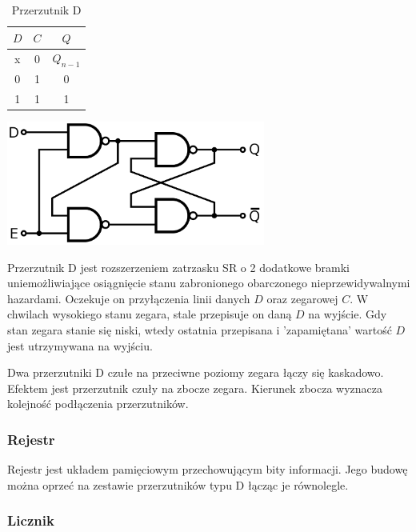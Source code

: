 \documentclass[a4paper,12pt]{article}
\begin{document}
\begin{table}[h!]
\centering

\begin{minipage}{6.5cm}
\centering

\begin{tabular}{ | c | c || c | }
  \hline
  $D$ & $C$ & $Q$ \\ \hline
  x & 0 & $Q_{n-1}$ \\
  0 & 1 & 0 \\
  1 & 1 & 1 \\
  \hline
\end{tabular}
\end{minipage}
\begin{minipage}{10cm}
   \includegraphics[width=8.5cm]{grafika/obwody/gated-D-latch.png}
   \caption*{Przerzutnik D}
\end{minipage}
\end{table}

Przerzutnik D jest rozszerzeniem zatrzasku SR o 2 dodatkowe bramki uniemożliwiające osiągnięcie stanu zabronionego obarczonego nieprzewidywalnymi hazardami. Oczekuje on przyłączenia linii danych $D$ oraz zegarowej $C$. W chwilach wysokiego stanu zegara, stale przepisuje on daną $D$ na wyjście. Gdy stan zegara stanie się niski, wtedy ostatnia przepisana i 'zapamiętana' wartość $D$ jest utrzymywana na wyjściu.


Dwa przerzutniki D czułe na przeciwne poziomy zegara łączy się kaskadowo. Efektem jest przerzutnik czuły na zbocze zegara. Kierunek zbocza wyznacza kolejność podłączenia przerzutników.

\subsubsection{Rejestr}

Rejestr jest układem pamięciowym przechowującym bity informacji. Jego budowę można oprzeć na zestawie przerzutników typu D łącząc je równolegle.

\subsubsection{Licznik}
\end{document}
